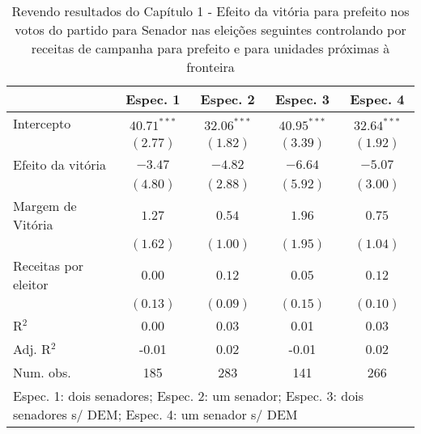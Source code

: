 
\begin{table}
\caption{Revendo resultados do Capítulo 1 - Efeito da vitória para prefeito nos votos do partido para Senador nas eleições seguintes controlando por receitas de campanha para prefeito e para unidades próximas à fronteira}
\begin{center}
\begin{tabular}{l c c c c }
\hline
                     & Espec. 1 & Espec. 2 & Espec. 3 & Espec. 4 \\
\hline
Intercepto           & $40.71^{***}$ & $32.06^{***}$ & $40.95^{***}$ & $32.64^{***}$ \\
                     & $(2.77)$      & $(1.82)$      & $(3.39)$      & $(1.92)$      \\
Efeito da vitória    & $-3.47$       & $-4.82$       & $-6.64$       & $-5.07$       \\
                     & $(4.80)$      & $(2.88)$      & $(5.92)$      & $(3.00)$      \\
Margem de Vitória    & $1.27$        & $0.54$        & $1.96$        & $0.75$        \\
                     & $(1.62)$      & $(1.00)$      & $(1.95)$      & $(1.04)$      \\
Receitas por eleitor & $0.00$        & $0.12$        & $0.05$        & $0.12$        \\
                     & $(0.13)$      & $(0.09)$      & $(0.15)$      & $(0.10)$      \\
\hline
R$^2$                & 0.00          & 0.03          & 0.01          & 0.03          \\
Adj. R$^2$           & -0.01         & 0.02          & -0.01         & 0.02          \\
Num. obs.            & 185           & 283           & 141           & 266           \\
\hline
\multicolumn{5}{l}{\scriptsize{Espec. 1: dois senadores; Espec. 2: um senador; Espec. 3: dois senadores s/ DEM; Espec. 4: um senador s/ DEM}}
\end{tabular}
\label{tab:c4t4}
\end{center}
\end{table}

